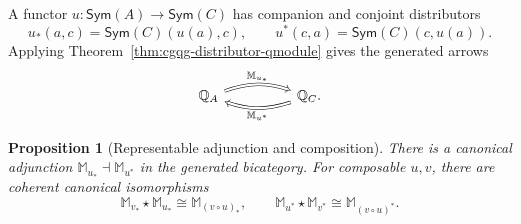 \documentclass[oneside]{article}
\newcommand{\Sym}{\mathsf{Sym}}
\theoremstyle{plain}
\newtheorem{proposition}[theorem]{Proposition}
\theoremstyle{definition}
\theoremstyle{remark}
\begin{document}
A functor \(u:\Sym(A)\to \Sym(C)\) has companion and conjoint distributors
\begin{equation}
 u_*(a,c)=\Sym(C)(u(a),c),\qquad
 u^*(c,a)=\Sym(C)(c,u(a)).
 \label{eq:cgqg-companion-distributors}
\end{equation}
Applying Theorem~\ref{thm:cgqg-distributor-qmodule} gives the generated arrows
\[
 \begin{tikzcd}[column sep=huge]
 \mathbb Q_A
   \arrow[r,bend left=18,Rightarrow,"\mathbb M_{u_*}"]
   &\mathbb Q_C
       \arrow[l,bend left=18,Rightarrow,"\mathbb M_{u^*}"].
 \end{tikzcd}
\]

\begin{proposition}[Representable adjunction and composition]
\label{prop:cgqg-representable-quantum-adjunction}
\label{prop:cgqg-representable-vertical-composition}
There is a canonical adjunction
\(\mathbb M_{u_*}\dashv\mathbb M_{u^*}\) in the generated bicategory.
For composable \(u,v\), there are coherent canonical isomorphisms
\[
 \mathbb M_{v_*}\star\mathbb M_{u_*}\cong\mathbb M_{(v\circ u)_*},
 \qquad
 \mathbb M_{u^*}\star\mathbb M_{v^*}\cong\mathbb M_{(v\circ u)^*}.
\]
\end{proposition}
\end{document}
